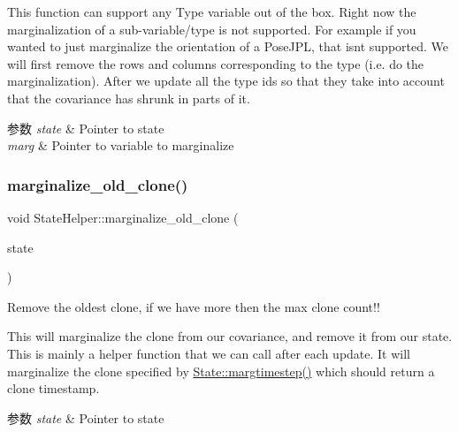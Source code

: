 This function can support any Type variable out of the box. Right now the marginalization of a sub-\/variable/type is not supported. For example if you wanted to just marginalize the orientation of a Pose\+J\+PL, that isn\textquotesingle{}t supported. We will first remove the rows and columns corresponding to the type (i.\+e. do the marginalization). After we update all the type ids so that they take into account that the covariance has shrunk in parts of it.


\begin{DoxyParams}{参数}
{\em state} & Pointer to state \\
\hline
{\em marg} & Pointer to variable to marginalize \\
\hline
\end{DoxyParams}
\mbox{\label{classov__msckf_1_1StateHelper_a18f86e6da0bf5e7d4879f8c2f1460a27}} 
\subsubsection{\texorpdfstring{marginalize\+\_\+old\+\_\+clone()}{marginalize\_old\_clone()}}
{\footnotesize\ttfamily void State\+Helper\+::marginalize\+\_\+old\+\_\+clone (\begin{DoxyParamCaption}\item[{std\+::shared\+\_\+ptr$<$ \hyperlink{classov__msckf_1_1State}{State} $>$}]{state }\end{DoxyParamCaption})\hspace{0.3cm}{\ttfamily [static]}}



Remove the oldest clone, if we have more then the max clone count!! 

This will marginalize the clone from our covariance, and remove it from our state. This is mainly a helper function that we can call after each update. It will marginalize the clone specified by \hyperlink{classov__msckf_1_1State_a36420e71ffa54625667eac2a8a345582}{State\+::margtimestep()} which should return a clone timestamp.


\begin{DoxyParams}{参数}
{\em state} & Pointer to state \\
\hline
\end{DoxyParams}
\mbox{\label{classov__msckf_1_1StateHelper_a54f8517a288b9362f29481f650f4b959}} 
